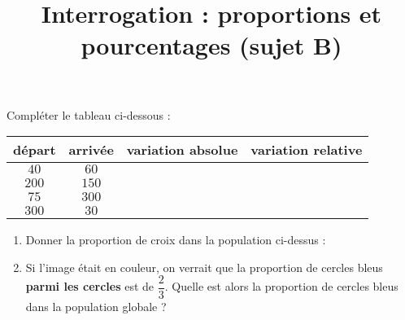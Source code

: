 \documentclass[
	classe=$2^{de}$,
	landscape,
	twocolumn,
	headerTitle={Interrogation}
]{évaluation}
\begin{document}
\begin{exercice}
	Compléter le tableau ci-dessous :
	\begin{center}
		\begin{tabular}{|c|c|c|c|}
			\hline
			départ & arrivée & variation absolue   & variation relative   \\ \hline
			$40$   & $60$    & \correction{$20$}   & \correction{$0,5$}   \\ \hline
			$200$  & $150$   & \correction{$-50$}  & \correction{$-0,25$} \\ \hline
			$75$   & $300$   & \correction{$225$}  & \correction{$3$}     \\ \hline
			$300$  & $30$    & \correction{$-270$} & \correction{$-0,9$}  \\ \hline
		\end{tabular}
	\end{center}
\end{exercice}

\newpage
\setcounter{exercice}{1}

\title{Interrogation : proportions et pourcentages (sujet B)}
\maketitle

\begin{exercice}
	\begin{center}
	\end{center}

	\begin{enumerate}
		\item Donner la proportion de croix dans la population ci-dessus : 
		\item Si l'image était en couleur, on verrait que la proportion de cercles bleus \textbf{parmi les cercles} est de $\dfrac{2}{3}$. Quelle est alors la proportion de cercles bleus dans la population globale ? 
	\end{enumerate}
\end{exercice}
\end{document}
